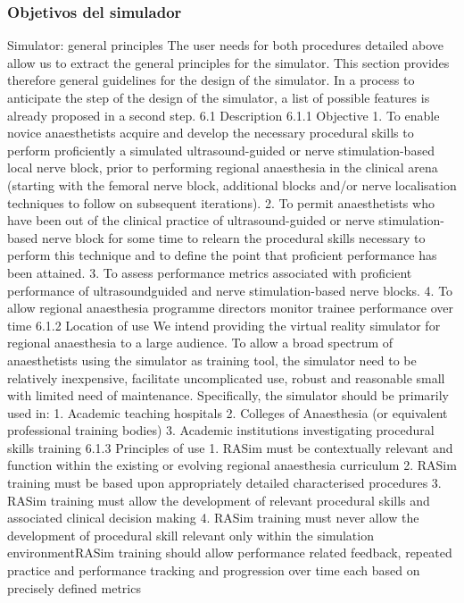 \subsubsection{Objetivos del simulador}
Simulator: general principles
The user needs for both procedures detailed above allow us to extract the general principles
for the simulator. This section provides therefore general guidelines for the design of the
simulator. In a process to anticipate the step of the design of the simulator, a list of possible
features is already proposed in a second step.
6.1 Description
6.1.1 Objective
1. To enable novice anaesthetists acquire and develop the necessary procedural skills to
perform proficiently a simulated ultrasound-guided or nerve stimulation-based local nerve
block, prior to performing regional anaesthesia in the clinical arena (starting with the
femoral nerve block, additional blocks and/or nerve localisation techniques to follow on
subsequent iterations).
2. To permit anaesthetists who have been out of the clinical practice of ultrasound-guided or
nerve stimulation-based nerve block for some time to relearn the procedural skills
necessary to perform this technique and to define the point that proficient performance
has been attained.
3. To assess performance metrics associated with proficient performance of ultrasoundguided
and nerve stimulation-based nerve blocks.
4. To allow regional anaesthesia programme directors monitor trainee performance over
time
6.1.2 Location of use
We intend providing the virtual reality simulator for regional anaesthesia to a large audience.
To allow a broad spectrum of anaesthetists using the simulator as training tool, the simulator
need to be relatively inexpensive, facilitate uncomplicated use, robust and reasonable small
with limited need of maintenance. Specifically, the simulator should be primarily used in:
1. Academic teaching hospitals
2. Colleges of Anaesthesia (or equivalent professional training bodies)
3. Academic institutions investigating procedural skills training
6.1.3 Principles of use
1. RASim must be contextually relevant and function within the existing or evolving regional
anaesthesia curriculum
2. RASim training must be based upon appropriately detailed characterised procedures
3. RASim training must allow the development of relevant procedural skills and associated
clinical decision making
4. RASim training must never allow the development of procedural skill relevant only within
the simulation environmentRASim training should allow performance related feedback, repeated practice and
performance tracking and progression over time each based on precisely defined metrics

